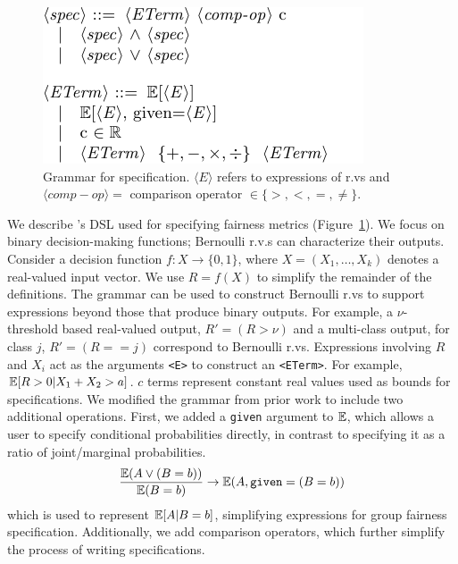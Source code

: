\begin{figure}
    \centering
    \includegraphics{avoir/images/grammar}
    \caption{Grammar for specification. $\langle E \rangle$ refers to  expressions of r.vs and $\langle comp-op \rangle = $ comparison operator $\in \{>, <, =, \neq\}$.}
    \label{fig:grammar}
\end{figure}
We describe \AVOIRmethodname{}'s DSL used for specifying fairness metrics (Figure~\ref{fig:grammar}).
We focus on binary decision-making functions; Bernoulli r.v.s can characterize their outputs.
Consider a decision function $f: X \rightarrow \{0, 1\}$, where $X = (X_1, \dots, X_k)$ denotes a real-valued input vector. 
We use $R = f(X)$ to simplify the remainder of the definitions. 
The grammar can be used to construct Bernoulli r.vs to support expressions beyond those that produce binary outputs.
For example, a $\nu$-threshold based real-valued output, $R' = (R > \nu)$ and a multi-class output, for class $j$,  $R' = (R == j)$ correspond to Bernoulli r.vs.
Expressions involving $R$ and $X_i$ act as the arguments \lstinline{<E>} to construct an \lstinline{<ETerm>}.
For example, $\mathbb{E}[R > 0 | X_1 + X_2 > a]$.
$c$ terms represent constant real values used as bounds for specifications.
We modified the grammar from prior work to include two additional operations. 
First, we added a \texttt{given} argument to $\mathbb{E}$, which allows a user to specify conditional probabilities directly, in contrast to specifying it as a ratio of joint/marginal probabilities. 
 \begin{align*}
     \frac{\mathbb{E}(A \vee (B=b))}{\mathbb{E}(B=b)} \rightarrow \mathbb{E}(A, \mathtt{given}=(B=b))
 \end{align*}
 which is used to represent $\mathbb{E}[A|B=b]$, simplifying expressions for group fairness specification.
Additionally, we add comparison operators, which further simplify the process of writing specifications. 

